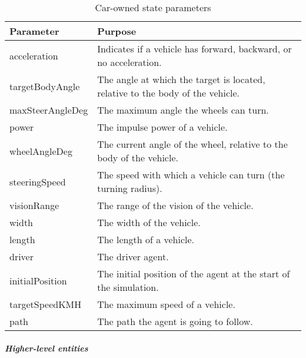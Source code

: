 	\begin{table}[H]
		\centering
		\begin{tabular}{|l | p{10.5cm} |}
			\hline
			Parameter				& Purpose \\ \hline \hline
			acceleration 			& Indicates if a vehicle has forward, backward, or no acceleration. \\ \hline
			targetBodyAngle 		& The angle at which the target is located, relative to the body of the vehicle. \\ \hline
			maxSteerAngleDeg 		& The maximum angle the wheels can turn. \\ \hline
			power 					& The impulse power of a vehicle. \\ \hline
			wheelAngleDeg 			& The current angle of the wheel, relative to the body of the vehicle. \\ \hline
			steeringSpeed 			& The speed with which a vehicle can turn (the turning radius). \\ \hline
			visionRange 			& The range of the vision of the vehicle. \\ \hline
			width 					& The width of the vehicle. \\ \hline
			length 					& The length of a vehicle. \\ \hline
			driver 					& The driver agent. \\ \hline
			initialPosition 		& The initial position of the agent at the start of the simulation. \\ \hline
			targetSpeedKMH			& The maximum speed of a vehicle. \\ \hline
			path					& The path the agent is going to follow. \\ \hline
		\end{tabular}
		\caption{Car-owned state parameters}
		\label{tab:par:method:model:overview:state:lowlevel:car}
	\end{table}

	\subparagraph{Higher-level entities}
	

